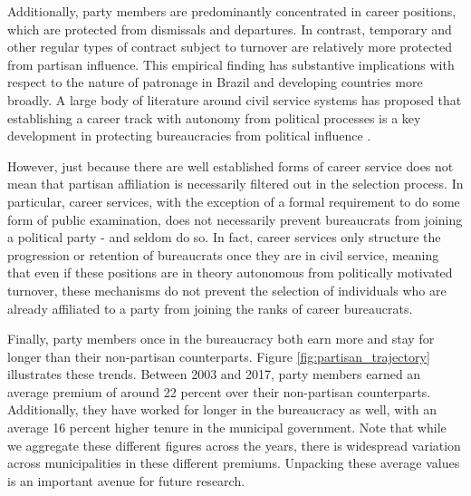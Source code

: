 \documentclass[12pt,a4paper]{article}
\begin{document}
Additionally, party members are predominantly concentrated in career positions, which are protected from dismissals and departures. In contrast, temporary and other regular types of contract subject to turnover are relatively more protected from partisan influence. This empirical finding has substantive implications with respect to the nature of patronage in Brazil and developing countries more broadly. A large body of literature around civil service systems has proposed that establishing a career track with autonomy from political processes is a key development in protecting bureaucracies from political influence \citep{grindle2012jobs,carpenter2020forging}.

However, just because there are well established forms of career service does not mean that partisan affiliation is necessarily filtered out in the selection process. In particular, career services, with the exception of a formal requirement to do some form of public examination, does not necessarily prevent bureaucrats from joining a political party - and seldom do so. In fact, career services only structure the progression or retention of bureaucrats once they are in civil service, meaning that even if these positions are in theory autonomous from politically motivated turnover, these mechanisms do not prevent the selection of individuals who are already affiliated to a party from joining the ranks of career bureaucrats. 

Finally, party members once in the bureaucracy both earn more and stay for longer than their non-partisan counterparts. Figure \ref{fig:partisan_trajectory} illustrates these trends. Between 2003 and 2017, party members earned an average premium of around 22 percent over their non-partisan counterparts. Additionally, they have worked for longer in the bureaucracy as well, with an average 16 percent higher tenure in the municipal government. Note that while we aggregate these different figures across the years, there is widespread variation across municipalities in these different premiums. Unpacking these average values is an important avenue for future research.
\end{document}
